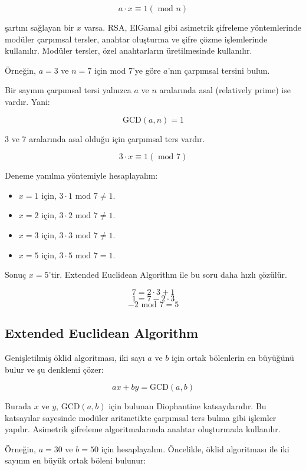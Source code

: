 \[ a \cdot x \equiv 1 (\text{ mod } n) \]

şartını sağlayan bir $x$ varsa. RSA, ElGamal gibi asimetrik şifreleme yöntemlerinde modüler çarpımsal tersler, anahtar oluşturma ve şifre çözme işlemlerinde kullanılır. Modüler tersler, özel anahtarların üretilmesinde kullanılır.

Örneğin, $a = 3$ ve $n = 7$ için mod 7'ye göre $a$'nın çarpımsal tersini bulun.

Bir sayının çarpımsal tersi yalnızca $a$ ve $n$ aralarında asal (relatively prime) ise vardır. Yani:

\[ \text{GCD}(a, n) = 1\]

3 ve 7 aralarında asal olduğu için çarpımsal ters vardır.

\[ 3 \cdot x \equiv 1 (\text{ mod } 7) \]

Deneme yanılma yöntemiyle hesaplayalım:

\begin{itemize}
    \item $x = 1$ için, $ 3 \cdot 1 \text{ mod } 7 \neq 1$.
    \item $x = 2$ için, $ 3 \cdot 2 \text{ mod } 7 \neq 1$.
    \item $x = 3$ için, $ 3 \cdot 3 \text{ mod } 7 \neq 1$.
    \item $x = 5$ için, $ 3 \cdot 5 \text{ mod } 7 = 1$.
\end{itemize}

Sonuç $x = 5$'tir. Extended Euclidean Algorithm ile bu soru daha hızlı çözülür.

\[ 7 = 2 \cdot 3 + 1 \]
\[ 1 = 7 - 2 \cdot 3 \]
\[ -2 \text{ mod } 7 = 5 \]

\newpage

\subsection{Extended Euclidean Algorithm}

Genişletilmiş öklid algoritması, iki sayı $a$ ve $b$ için ortak bölenlerin en büyüğünü bulur ve şu denklemi çözer:

\[ ax + by = \text{GCD}(a, b) \]

Burada $x$ ve $y$, $\text{GCD}(a, b)$ için bulunan Diophantine katsayılarıdır. Bu katsayılar sayesinde modüler aritmetikte çarpımsal ters bulma gibi işlemler yapılır. Asimetrik şifreleme algoritmalarında anahtar oluşturmada kullanılır.

Örneğin, $a = 30$ ve $b = 50$ için hesaplayalım. Öncelikle, öklid algoritması ile iki sayının en büyük ortak böleni bulunur:

